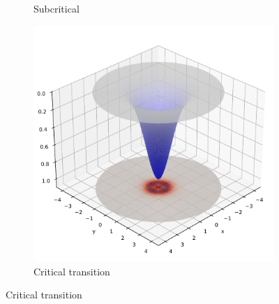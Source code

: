 \documentclass[12pt]{article}
\begin{document}
\begin{figure}[H]
\begin{subfigure}[b]{0.3\textwidth}
    \caption{Subcritical}
  \end{subfigure}
  \hfill
  \begin{subfigure}[b]{0.3\textwidth}
    \includegraphics[width=\textwidth]{frame_075_critical_transition.pdf}
    \caption{Critical transition}
  \end{subfigure}

  \par\vspace{0.5em}


\end{figure}
\end{document}
